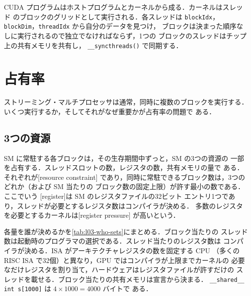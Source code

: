 \documentclass[../main.tex]{subfiles}
\begin{document}
\begin{keypoint}
  CUDA プログラムはホストプログラムとカーネルから成る．カーネルはスレッド
  のブロックのグリッドとして実行される．各スレッドは \texttt{blockIdx}，
  \texttt{blockDim}，\texttt{threadIdx} から自分のデータを見つけ，
  ブロックは決まった順序なしに実行されるので独立でなければならず，1つの
  ブロックのスレッドはチップ上の共有メモリを共有し，
  \texttt{\_\_syncthreads()} で同期する．
\end{keypoint}

\section{占有率}
\label{sec:l03-occupancy}

ストリーミング・マルチプロセッサは通常，同時に複数のブロックを実行する．
いくつ実行するか，そしてそれがなぜ重要かが占有率の問題で
ある．

\subsection{3つの資源}

\begin{definition}[資源制約]
  SM に常駐する各ブロックは，その生存期間中ずっと，SM の3つの資源の
  一部を占有する．スレッドスロットの数，レジスタの数，共有メモリの量で
  ある．それぞれが[resource constraint]
  であり，同時に常駐できるブロック数は，3つのどれか（および SM 当たりの
  ブロック数の固定上限）が許す最小の数である．ここでいう
  [register]は SM のレジスタファイルの32ビット
  エントリ1つであり，スレッドが必要とするレジスタ数はコンパイラが決める．
  多数のレジスタを必要とするカーネルは[register pressure]
  が高いという．
\end{definition}

各量を誰が決めるかを\cref{tab:l03-who-sets}にまとめる．ブロック当たりの
スレッド数は起動時のプログラマの選択である．スレッド当たりのレジスタ数は
コンパイラが決める．ISA がアーキテクチャレジスタの数を固定する CPU
（多くの RISC ISA で32個）と異なり，GPU ではコンパイラが上限までカーネルの
必要なだけレジスタを割り当て，ハードウェアはレジスタファイルが許すだけの
スレッドを載せる．ブロック当たりの共有メモリは宣言から決まる．
\texttt{\_\_shared\_\_ int s[1000]} は $4 \times 1000 = 4000$ バイトで
ある．
\end{document}
